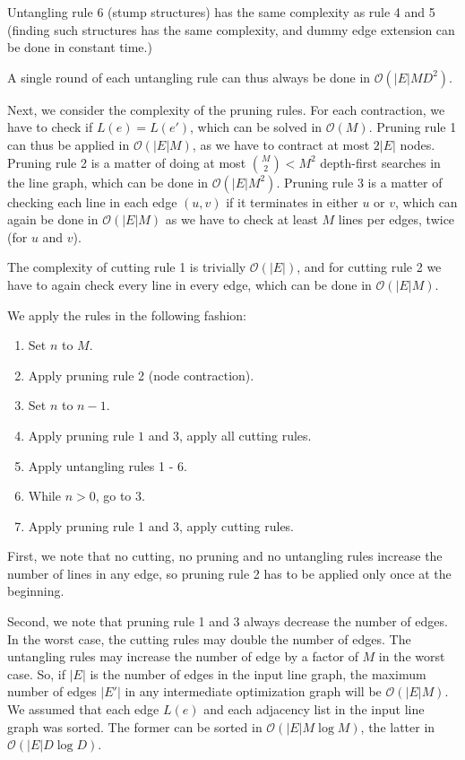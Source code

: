 \documentclass[format=acmsmall, review=false, screen=true]{acmart}
\begin{document}
Untangling rule 6 (stump structures) has the same complexity as rule 4 and 5 (finding such structures has the same complexity, and dummy edge extension can be done in constant time.)

A single round of each untangling rule can thus always be done in $\mathcal{O}(|E|MD^2)$.

Next, we consider the complexity of the pruning rules.
For each contraction, we have to check if $L(e) = L(e')$, which can be solved in $\mathcal{O}(M)$.
Pruning rule 1 can thus be applied in $\mathcal{O}(|E|M)$, as we have to contract at most $2|E|$ nodes.
Pruning rule 2 is a matter of doing at most ${M \choose 2} < M^2$ depth-first searches in the line graph, which can be done in $\mathcal{O}(|E|M^2)$.
Pruning rule 3 is a matter of checking each line in each edge $(u, v)$ if it terminates in either $u$ or $v$, which can again be done in $\mathcal{O}(|E|M)$ as we have to check at least $M$ lines per edges, twice (for $u$ and $v$).

The complexity of cutting rule 1 is trivially $\mathcal{O}(|E|)$, and for cutting rule 2 we have to again check every line in every edge, which can be done in $\mathcal{O}(|E|M)$.

We apply the rules in the following fashion:

\begin{enumerate}
  \item Set $n$ to $M$.
  \item Apply pruning rule 2 (node contraction).
  \item Set $n$ to $n - 1$.
  \item Apply pruning rule $1$ and $3$, apply all cutting rules.
  \item Apply untangling rules 1 - 6.
  \item While $n > 0$, go to $3$.
  \item Apply pruning rule 1 and 3, apply cutting rules.
\end{enumerate}

First, we note that no cutting, no pruning and no untangling rules increase the number of lines in any edge, so pruning rule 2 has to be applied only once at the beginning.

Second, we note that pruning rule 1 and 3 always decrease the number of edges.
In the worst case, the cutting rules may double the number of edges.
The untangling rules may increase the number of edge by a factor of $M$ in the worst case.
So, if $|E|$ is the number of edges in the input line graph, the maximum number of edges $|E'|$ in any intermediate optimization graph will be $\mathcal{O}(|E|M)$.
We assumed that each edge $L(e)$ and each adjacency list in the input line graph was sorted. The former can be sorted in $\mathcal{O}(|E|M\log M)$, the latter in $\mathcal{O}(|E|D\log D)$.
\end{document}
